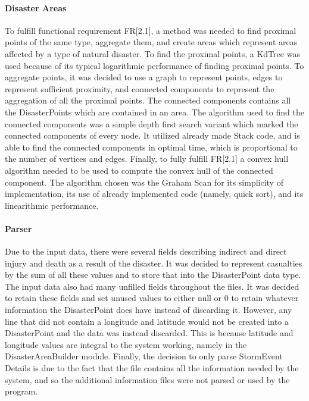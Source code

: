 \documentclass[12pt]{article}
\begin{document}
    \paragraph{Disaster Areas} To fulfill functional requirement FR[2.1], a method was needed to find proximal points of the same type, aggregate them, and create areas which represent areas affected by a type of natural disaster. To find the proximal points, a KdTree was used because of its typical logarithmic performance of finding proximal points. To aggregate points, it was decided to use a graph to represent points, edges to represent sufficient proximity, and connected components to represent the aggregation of all the proximal points. The connected components contains all the DisasterPoints which are contained in an area. The algorithm used to find the connected components was a simple depth first search variant which marked the connected components of every node. It utilized already made Stack code, and is able to find the connected components in optimal time, which is proportional to the number of vertices and edges. Finally, to fully fulfill FR[2.1] a convex hull algorithm needed to be used to compute the convex hull of the connected component. The algorithm chosen was the Graham Scan for its simplicity of implementation, its use of already implemented code (namely, quick sort), and its linearithmic performance.
  
    \paragraph{Parser} Due to the input data, there were several fields describing indirect and direct injury and death as a result of the disaster. It was decided to represent casualties by the sum of all these values and to store that into the DisasterPoint data type. The input data also had many unfilled fields throughout the files. It was decided to retain these fields and set unused values to either null or 0 to retain whatever information the DisasterPoint does have instead of discarding it. However, any line that did not contain a longitude and latitude would not be created into a DisasterPoint and the data was instead discarded. This is because latitude and longitude values are integral to the system working, namely in the DisasterAreaBuilder module. Finally, the decision to only parse StormEvent Details is due to the fact that the file contains all the information needed by the system, and so the additional information files were not parsed or used by the program.
    
\end{document}
